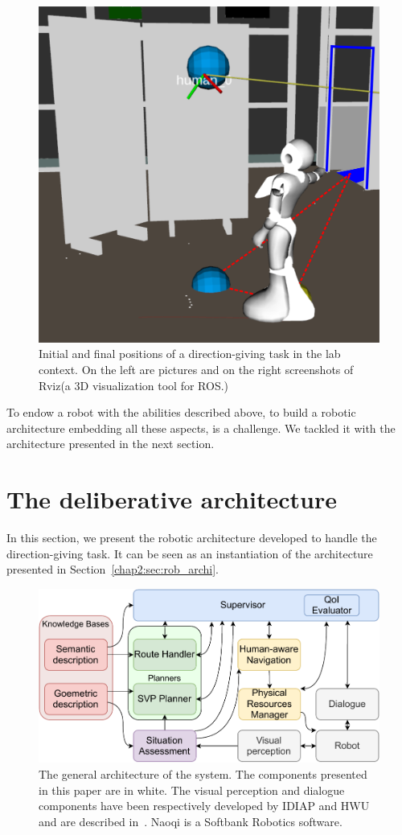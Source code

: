 \documentclass[a4paper,11pt,twoside]{StyleThese}
\begin{document}
\begin{figure}[!ht]
{\begin{minipage}{\linewidth}
			\includegraphics[width=.4\linewidth]{figures/chapter3/final_pose.jpg}
		\end{minipage}
	}\par  
	\caption[pos]{Initial and final positions of a direction-giving task in the lab context. On the left are pictures and on the right screenshots of Rviz\footnotemark (a 3D visualization tool for ROS.)}
	\label{fig:chap3_dir_giving_task}
\end{figure}


To endow a robot with the abilities described above, to build a robotic architecture embedding all these aspects, is a challenge. We tackled it with the architecture presented in the next section.

\section{The deliberative architecture}\label{sec:globalarchi}

In this section, we present the robotic architecture developed to handle the direction-giving task. It can be seen as an instantiation of the architecture presented in Section~\ref{chap2:sec:rob_archi}.  

\begin{figure}[ht!]
	\centering
	\includegraphics[width=\textwidth]{figures/chapter3/schema_archi.pdf}
	\caption{\label{fig:chap3_architecture} The general architecture of the system. The components presented in this paper are in\cite{matsumoto_2012_you} white. The visual perception and dialogue components have been respectively developed by IDIAP and HWU and are described in~\cite{foster_2019_mummer}. Naoqi is a Softbank Robotics software.}
\end{figure}
\end{document}
